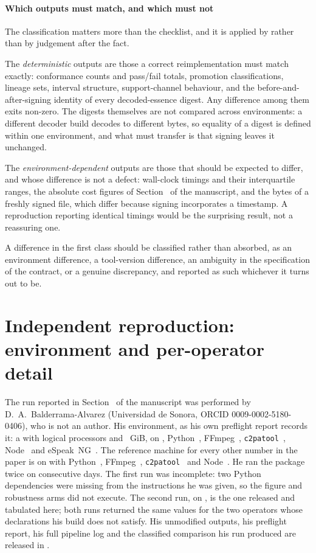 \documentclass[11pt]{article}
\begin{document}
\paragraph{Which outputs must match, and which must not} The classification
matters more than the checklist, and it is applied by
 rather than by judgement after the fact.

The \emph{deterministic} outputs are those a correct reimplementation must match
exactly: conformance counts and pass/fail totals, promotion classifications,
lineage sets, interval structure, support-channel behaviour, and the
before-and-after-signing identity of every decoded-essence digest. Any
difference among them exits non-zero. The digests themselves are not compared
across environments: a different decoder build decodes to different bytes, so
equality of a digest is defined within one environment, and what must transfer
is that signing leaves it unchanged.

The \emph{environment-dependent} outputs are those that should be expected to
differ, and whose difference is not a defect: wall-clock timings and their
interquartile ranges, the absolute cost figures of Section~\SecOverhead{} of the
manuscript, and the bytes of a freshly signed file, which differ because signing
incorporates a timestamp. A reproduction reporting identical timings would be
the surprising result, not a reassuring one.

A difference in the first class should be classified rather than absorbed, as an
environment difference, a tool-version difference, an ambiguity in the
specification of the contract, or a genuine discrepancy, and reported as such
whichever it turns out to be.

\section{Independent reproduction: environment and per-operator detail}
\label{s:independent}

The run reported in Section~\SecIndependent{} of the manuscript was performed by
D.~A.~Balderrama-Alvarez (Universidad de Sonora, ORCID 0009-0002-5180-0406),
who is not an author. His environment, as his own preflight report records it:
a \IRcpu{} with \IRcores{} logical processors and \IRmem{}~GiB, \IRos{} on
\IRarch{}, Python~\IRpython{}, FFmpeg~\IRffmpeg{},
\texttt{c2patool}~\IRcTwopatool{}, Node~\IRnode{} and
eSpeak~NG~\IRespeak{}. The reference machine for every other
number in the paper is \Vos{} on \Varch{} with Python~\Vpython{},
FFmpeg~\Vffmpeg{}, \texttt{c2patool}~\VcTwopatool{} and Node~\Vnode{}. He ran the
package twice on consecutive days. The first run was incomplete: two Python
dependencies were missing from the instructions he was given, so the figure and
robustness arms did not execute. The second run, on \IRdate{}, is the one
released and tabulated here; both runs returned the same values for the two
operators whose declarations his build does not satisfy. His unmodified outputs, his preflight report, his full pipeline log and
the classified comparison his run produced are released in
.
\end{document}
